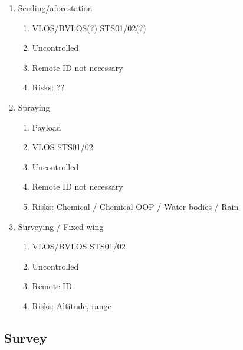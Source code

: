 \documentclass{ua_wgs_base}
\begin{document}
\begin{enumerate}

   \item Seeding/aforestation

\begin{enumerate}
   \item VLOS/BVLOS(?) STS01/02(?)
   \item Uncontrolled
   \item Remote ID not necessary
   \item Risks: ??
\end{enumerate}
   \item Spraying
\begin{enumerate}
         \item Payload 
         \item VLOS STS01/02
         \item Uncontrolled
         \item Remote ID not necessary
         \item Risks: Chemical / Chemical OOP / Water bodies / Rain
\end{enumerate}
         \item Surveying / Fixed wing
\begin{enumerate}
  \item VLOS/BVLOS STS01/02
  \item Uncontrolled
  \item Remote ID
  \item Risks: Altitude, range
\end{enumerate}

\end{enumerate}

\subsection{Survey} 
\end{document}
